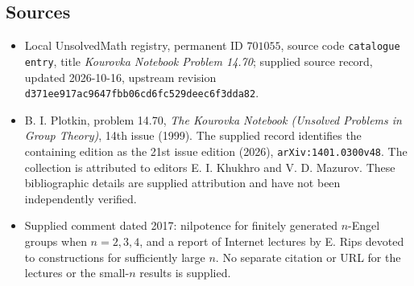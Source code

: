 \documentclass[11pt]{article}
\begin{document}
\subsection{Sources}
\begin{itemize}
\item Local UnsolvedMath registry, permanent ID \(701055\), source code \texttt{catalogue entry}, title \emph{Kourovka Notebook Problem 14.70}; supplied source record, updated 2026-10-16, upstream revision \texttt{d371ee917ac9647fbb06cd6fc529deec6f3dda82}.
\item B. I. Plotkin, problem 14.70, \emph{The Kourovka Notebook (Unsolved Problems in Group Theory)}, 14th issue (1999). The supplied record identifies the containing edition as the 21st issue edition (2026), \texttt{arXiv:1401.0300v48}. The collection is attributed to editors E. I. Khukhro and V. D. Mazurov. These bibliographic details are supplied attribution and have not been independently verified.
\item Supplied comment dated 2017: nilpotence for finitely generated \(n\)-Engel groups when \(n=2,3,4\), and a report of Internet lectures by E. Rips devoted to constructions for sufficiently large \(n\). No separate citation or URL for the lectures or the small-\(n\) results is supplied.
\end{itemize}
\end{document}
